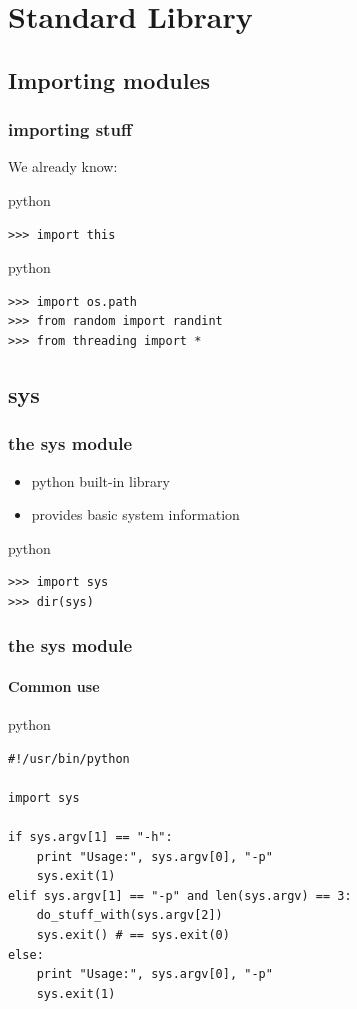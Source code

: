 \documentclass{beamer}
\begin{document}
	
\section{Standard Library}
\subsection{Importing modules}

\begin{frame}[fragile]
	\frametitle{importing stuff}
	We already know:
	\begin{exampleblock}{python}
	\begin{lstlisting}
>>> import this
	\end{lstlisting}
	\end{exampleblock}

\pause

	\begin{exampleblock}{python}
	\begin{lstlisting}
>>> import os.path
>>> from random import randint
>>> from threading import *
	\end{lstlisting}
	\end{exampleblock}
\end{frame}

\subsection{sys} 
\begin{frame}[fragile]
    \frametitle{the sys module}
    \begin{itemize}
    \item python built-in library
    \item provides basic system information
    \end{itemize}

    \begin{exampleblock}{python}
    \begin{lstlisting}
>>> import sys
>>> dir(sys)
    \end{lstlisting}
    \end{exampleblock}
\end{frame}

\begin{frame}[fragile]
	\frametitle{the sys module}
	\framesubtitle{Common use}
    \begin{exampleblock}{python}
    \begin{lstlisting}
#!/usr/bin/python

import sys

if sys.argv[1] == "-h":
    print "Usage:", sys.argv[0], "-p"
    sys.exit(1)
elif sys.argv[1] == "-p" and len(sys.argv) == 3:
    do_stuff_with(sys.argv[2])
    sys.exit() # == sys.exit(0)
else:
    print "Usage:", sys.argv[0], "-p"
    sys.exit(1)
	\end{lstlisting}
    \end{exampleblock}
\end{frame}
\end{document}
